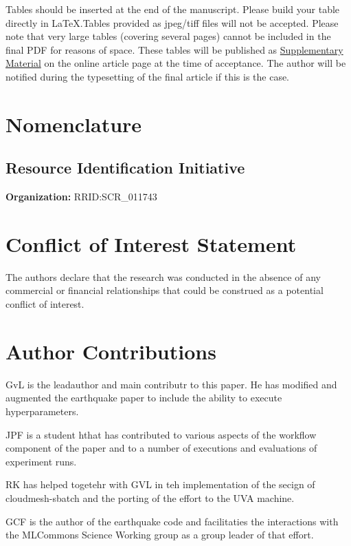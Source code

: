 \documentclass[utf8]{frontiersSCNS} %
\begin{document}
Tables should be inserted at the end of the manuscript. Please build
your table directly in LaTeX.Tables provided as jpeg/tiff files will
not be accepted. Please note that very large tables (covering several
pages) cannot be included in the final PDF for reasons of space. These
tables will be published as
\href{http://home.frontiersin.org/about/author-guidelines#SupplementaryMaterial}{Supplementary
  Material} on the online article page at the time of acceptance. The
author will be notified during the typesetting of the final article if
this is the case.

\section{Nomenclature}

\subsection{Resource Identification Initiative}

{\bf Organization:} RRID:SCR_011743

\section*{Conflict of Interest Statement}

The authors declare that the research was conducted in the absence of
any commercial or financial relationships that could be construed as a
potential conflict of interest.

\section*{Author Contributions}

GvL is the leadauthor and main contributr to this paper. He has
modified and augmented the earthquake paper to include the ability to
execute hyperparameters. 

JPF is a student hthat has contributed to various aspects of the
workflow component of the paper and to a number of executions and
evaluations of experiment runs.

RK has helped togetehr with GVL in teh implementation of the secign of
cloudmesh-sbatch and the porting of the effort to the UVA machine.

GCF is the author of the earthquake code and facilitaties the
interactions with the MLCommons Science Working group as a group
leader of that effort.
\end{document}
